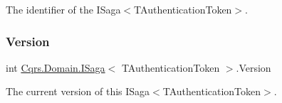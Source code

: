 The identifier of the I\+Saga$<$\+T\+Authentication\+Token$>$. 

\mbox{\label{interfaceCqrs_1_1Domain_1_1ISaga_a83a02ff45543d670356dde4149cdc614_a83a02ff45543d670356dde4149cdc614}} 
\subsubsection{\texorpdfstring{Version}{Version}}
{\footnotesize\ttfamily int \hyperlink{interfaceCqrs_1_1Domain_1_1ISaga}{Cqrs.\+Domain.\+I\+Saga}$<$ T\+Authentication\+Token $>$.Version\hspace{0.3cm}{\ttfamily [get]}}



The current version of this I\+Saga$<$\+T\+Authentication\+Token$>$. 

